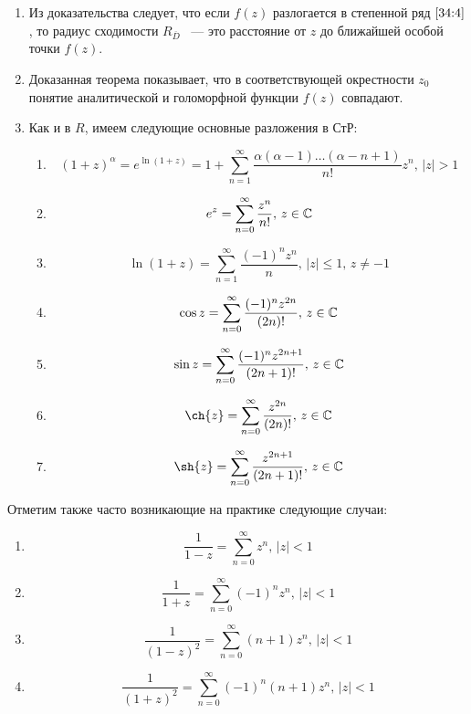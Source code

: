 \documentclass[../../main.tex]{subfiles}
\begin{document}
\begin{rem}
	\begin{enumerate}
		\item Из доказательства следует, что если $ f(z) $ разлогается в степенной ряд $ \eqref{34:4} $, то радиус сходимости $ R_{\overline{D}} $ ~--- это расстояние от $ z $ до ближайшей особой точки $ f(z) $.
		
		\item Доказанная теорема показывает, что в соответствующей окрестности $ z_0 $ понятие аналитической и голоморфной функции $f(z)$ совпадают.
		
		\item Как и в $R$, имеем следующие основные разложения в СтР:
		
		\begin{enumerate}
			\item \[ (1 + z)^\alpha = e^{\ln(1 + z)} = 1 + \sum\limits_{n = 1}^{\infty} \frac{\alpha(\alpha - 1) \ldots (\alpha - n +1)}{n!}z^n,\, |z| > 1 \]
			
			\item \[ e^z = \sum\limits_{n = 0}^{\infty} \frac{z^n}{n!},\, z \in \mathbb{C} \]
			
			\item \[ \ln(1 + z) = \sum\limits_{n = 1}^{\infty} \frac{(-1)^nz^n}{n},\, |z| \leq 1,\, z \neq -1 \]
			
			\item \[ \cos{z} = \sum\limits_{n = 0}^{\infty} \frac{(-1)^nz^{2n}}{(2n)!},\, z \in \mathbb{C} \]
			
			\item \[ \sin{z} = \sum\limits_{n = 0}^{\infty} \frac{(-1)^nz^{2n + 1}}{(2n + 1)!},\, z \in \mathbb{C} \]
			
			\item \[ \ch{z} = \sum\limits_{n = 0}^{\infty} \frac{z^{2n}}{(2n)!},\, z \in \C \]
			
			\item \[ \sh{z} = \sum\limits_{n = 0}^{\infty} \frac{z^{2n + 1}}{(2n + 1)!},\, z \in \C \]
		\end{enumerate}
	\end{enumerate}
\end{rem}

Отметим также часто возникающие на практике следующие случаи:

\begin{enumerate}
	\item \[ \frac{1}{1 - z} = \sum\limits_{n = 0}^{\infty} z^n,\, |z| < 1 \]
	
	\item \[ \frac{1}{1 + z} = \sum\limits_{n = 0}^{\infty} (-1)^nz^n,\, |z| < 1 \]

	\item \[ \frac{1}{(1 - z)^2} = \sum\limits_{n = 0}^{\infty} (n + 1)z^n,\, |z| < 1 \]
	
	\item \[ \frac{1}{(1 + z)^2} = \sum\limits_{n = 0}^{\infty} (-1)^n(n + 1)z^n,\, |z| < 1 \]
\end{enumerate}
\end{document}
